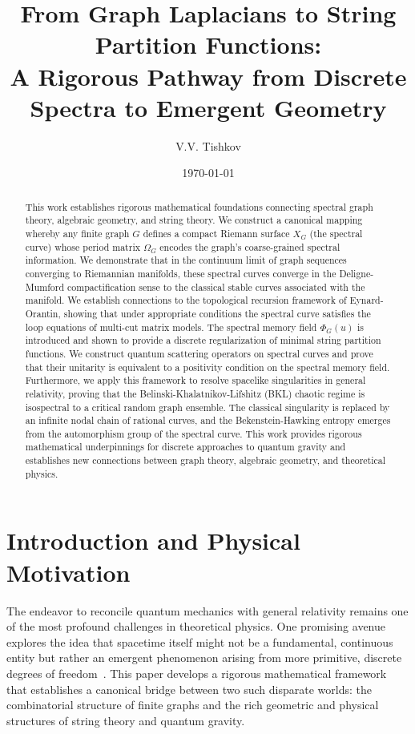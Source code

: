 \documentclass[12pt]{article}
\title{From Graph Laplacians to String Partition Functions: \\ A Rigorous Pathway from Discrete Spectra to Emergent Geometry}
\author{V.V. Tishkov}
\date{\today}
\theoremstyle{definition}
\begin{document}
\maketitle

\begin{abstract}
This work establishes rigorous mathematical foundations connecting spectral graph theory, algebraic geometry, and string theory. We construct a canonical mapping whereby any finite graph $G$ defines a compact Riemann surface $X_G$ (the spectral curve) whose period matrix $\Omega_G$ encodes the graph's coarse-grained spectral information. We demonstrate that in the continuum limit of graph sequences converging to Riemannian manifolds, these spectral curves converge in the Deligne-Mumford compactification sense to the classical stable curves associated with the manifold. We establish connections to the topological recursion framework of Eynard-Orantin, showing that under appropriate conditions the spectral curve satisfies the loop equations of multi-cut matrix models. The spectral memory field $\Phi_G(u)$ is introduced and shown to provide a discrete regularization of minimal string partition functions. We construct quantum scattering operators on spectral curves and prove that their unitarity is equivalent to a positivity condition on the spectral memory field. Furthermore, we apply this framework to resolve spacelike singularities in general relativity, proving that the Belinski-Khalatnikov-Lifshitz (BKL) chaotic regime is isospectral to a critical random graph ensemble. The classical singularity is replaced by an infinite nodal chain of rational curves, and the Bekenstein-Hawking entropy emerges from the automorphism group of the spectral curve. This work provides rigorous mathematical underpinnings for discrete approaches to quantum gravity and establishes new connections between graph theory, algebraic geometry, and theoretical physics.
\end{abstract}

\tableofcontents

\section{Introduction and Physical Motivation}
The endeavor to reconcile quantum mechanics with general relativity remains one of the most profound challenges in theoretical physics. One promising avenue explores the idea that spacetime itself might not be a fundamental, continuous entity but rather an emergent phenomenon arising from more primitive, discrete degrees of freedom~\cite{Carroll2004}. This paper develops a rigorous mathematical framework that establishes a canonical bridge between two such disparate worlds: the combinatorial structure of finite graphs and the rich geometric and physical structures of string theory and quantum gravity.
\end{document}
